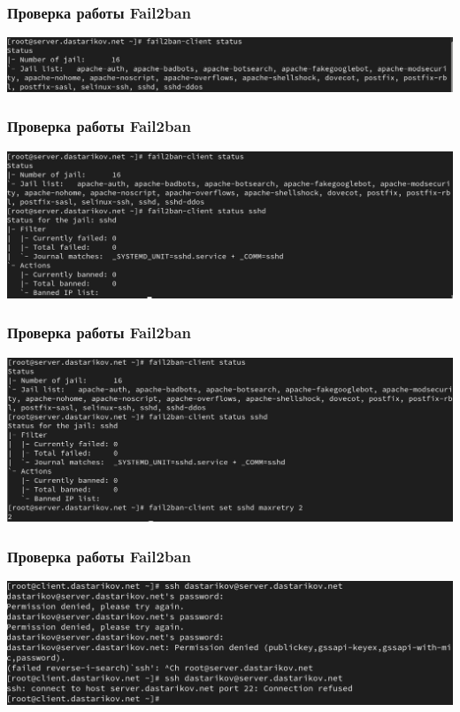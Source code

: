 \begin{frame}
\frametitle{Проверка работы Fail2ban}
    \centering
    \includegraphics[width=\textwidth]{../images/image09.png}
\end{frame}

\begin{frame}
\frametitle{Проверка работы Fail2ban}
    \centering
    \includegraphics[width=\textwidth]{../images/image10.png}
\end{frame}

\begin{frame}
\frametitle{Проверка работы Fail2ban}
    \centering
    \includegraphics[width=\textwidth]{../images/image11.png}
\end{frame}

\begin{frame}
\frametitle{Проверка работы Fail2ban}
    \centering
    \includegraphics[width=\textwidth]{../images/image12.png}
\end{frame}

